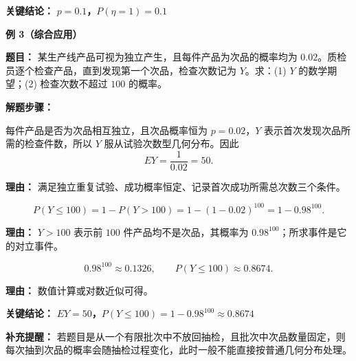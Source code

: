 \begin{examplebox}
	\textbf{\textcolor{CExample}{关键结论：}} \textbf{$p=0.1$，$P(\eta=1)=0.1$}

	\medskip

	\textbf{\textcolor{CExample}{例 3（综合应用）}}

	\textbf{\textcolor{CExample}{题目：}}
	某生产线产品可视为独立产生，且每件产品为次品的概率均为 $0.02$。质检员逐个检查产品，直到发现第一个次品，检查次数记为 $Y$。求：(1) $Y$ 的数学期望；(2) 检查次数不超过 $100$ 的概率。

	\textbf{\textcolor{CExample}{解题步骤：}}

	\begin{description}[style=nextline, leftmargin=2.8em, labelsep=0.5em, itemsep=0.45em]
		\item[\textbf{第一步（识别分布并求期望）：}]
		      每件产品是否为次品相互独立，且次品概率恒为 $p=0.02$，$Y$ 表示首次发现次品所需的检查件数，所以 $Y$ 服从试验次数型几何分布。因此
		      \[
			      EY=\frac{1}{0.02}=50.
		      \]
		      \par\textbf{理由：} 满足独立重复试验、成功概率恒定、记录首次成功所需总次数三个条件。

		\item[\textbf{第二步（概率表达）：}]
		      \[
			      P(Y\le100)=1-P(Y>100)=1-(1-0.02)^{100}=1-0.98^{100}.
		      \]
		      \par\textbf{理由：} $Y>100$ 表示前 $100$ 件产品均不是次品，其概率为 $0.98^{100}$；所求事件是它的对立事件。

		\item[\textbf{第三步（近似计算）：}]
		      \[
			      0.98^{100}\approx0.1326,\qquad P(Y\le100)\approx0.8674.
		      \]
		      \par\textbf{理由：} 数值计算或对数近似可得。
	\end{description}

	\textbf{\textcolor{CExample}{关键结论：}} \textbf{$EY=50$，$P(Y\le100)=1-0.98^{100}\approx0.8674$}

	\medskip

	\textbf{\textcolor{CExample}{补充提醒：}}
	若题目是从一个有限批次中不放回抽检，且批次中次品数量固定，则每次抽到次品的概率会随抽检过程变化，此时一般不能直接按普通几何分布处理。
\end{examplebox}